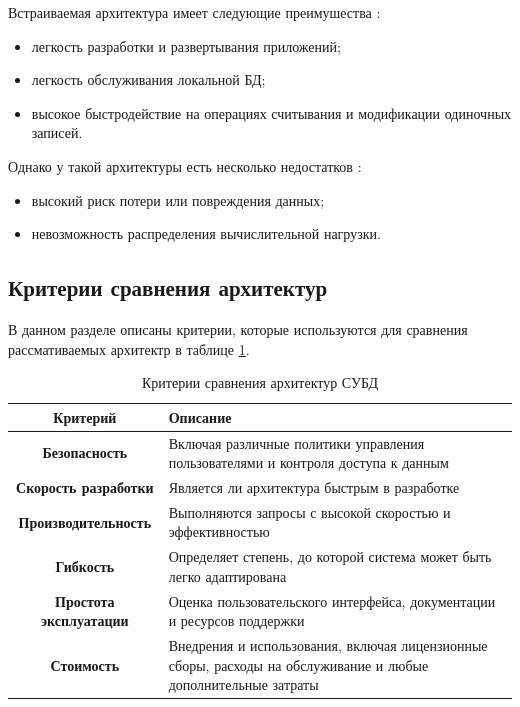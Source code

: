 Встраиваемая архитектура имеет следующие преимушества \cite{classichoose}:
\begin{itemize}
	\item легкость разработки и развертывания приложений;
	\item легкость обслуживания локальной БД;
	\item высокое быстродействие на операциях считывания и модификации одиночных записей.
\end{itemize}

Однако у такой архитектуры есть несколько недостатков \cite{classichoose}:
\begin{itemize}
	\item высокий риск потери или повреждения данных;
	\item невозможность распределения вычислительной нагрузки.
\end{itemize}

\subsection{Критерии сравнения архитектур}
В данном разделе описаны критерии, которые используются для сравнения рассмативаемых архитектр в таблице \ref{tb:criteria}.

\begin{table}[ht]
	\begin{center}
		\begin{threeparttable}
			\caption{\label{tb:criteria}Критерии сравнения архитектур СУБД}
			\begin{tabular}{|c|p{8cm}|}
				\hline
				\textbf{Критерий} & \textbf{Описание} \\ \hline
				\textbf{Безопасность} & Включая различные политики управления пользователями и контроля доступа к данным \\ \hline
				\textbf{Скорость разработки} & Является ли архитектура быстрым в разработке \\ \hline
				\textbf{Производительность} & Выполняются запросы с высокой скоростью и эффективностью  \\ \hline
				\textbf{Гибкость} & Определяет степень, до которой система может быть легко адаптирована \\ \hline
				\textbf{Простота эксплуатации} & Оценка пользовательского интерфейса, документации и ресурсов поддержки \\ \hline
				\textbf{Стоимость} & Внедрения и использования, включая лицензионные сборы, расходы на обслуживание и любые дополнительные затраты \\ \hline
			\end{tabular}
		\end{threeparttable}
	\end{center}
\end{table}
\clearpage
